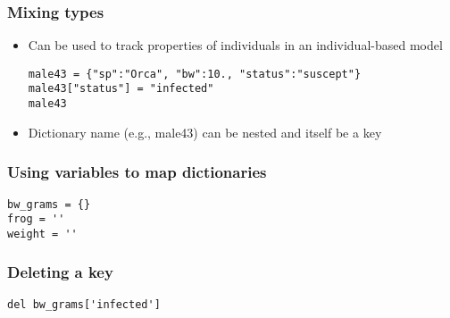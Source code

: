 \documentclass{beamer}
\begin{document}
\begin{frame}[fragile]
\frametitle{Mixing types}
\begin{itemize}
\item Can be used to track properties of individuals in an individual-based model
\begin{lstlisting}
male43 = {"sp":"Orca", "bw":10., "status":"suscept"}
male43["status"] = "infected"
male43
\end{lstlisting}
\item Dictionary name (e.g., male43) can be nested and itself be a key
\end{itemize}
\end{frame}

\begin{frame}[fragile]
\frametitle{Using variables to map dictionaries}
\begin{lstlisting}
bw_grams = {}
frog = ''
weight = ''

\end{lstlisting}
\end{frame}

\begin{frame}[fragile]
\frametitle{Deleting a key}
\begin{lstlisting}
del bw_grams['infected']

\end{lstlisting}
\end{frame}
\end{document}
